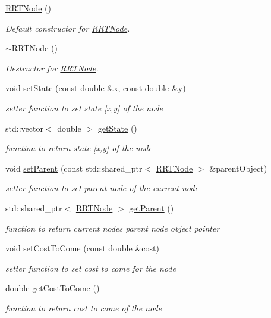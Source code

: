 \begin{DoxyCompactItemize}
\item 
\hyperlink{classRRTNode_a450dfa8045c8da49f359790501878106}{R\+R\+T\+Node} ()
\begin{DoxyCompactList}\small\item\em Default constructor for \hyperlink{classRRTNode}{R\+R\+T\+Node}. \end{DoxyCompactList}\item 
\hyperlink{classRRTNode_a6809e4173f614885337cb9e0f1ab3222}{$\sim$\+R\+R\+T\+Node} ()
\begin{DoxyCompactList}\small\item\em Destructor for \hyperlink{classRRTNode}{R\+R\+T\+Node}. \end{DoxyCompactList}\item 
void \hyperlink{classRRTNode_ab1a5aa8a8e7c33fca0cee09c208a2b51}{set\+State} (const double \&x, const double \&y)
\begin{DoxyCompactList}\small\item\em setter function to set state \mbox{[}x,y\mbox{]} of the node \end{DoxyCompactList}\item 
std\+::vector$<$ double $>$ \hyperlink{classRRTNode_a73f2b83a8babef45d6336cd512532257}{get\+State} ()
\begin{DoxyCompactList}\small\item\em function to return state \mbox{[}x,y\mbox{]} of the node \end{DoxyCompactList}\item 
void \hyperlink{classRRTNode_a168d651956a9d3ff5a97dfc14b2cbff9}{set\+Parent} (const std\+::shared\+\_\+ptr$<$ \hyperlink{classRRTNode}{R\+R\+T\+Node} $>$ \&parent\+Object)
\begin{DoxyCompactList}\small\item\em setter function to set parent node of the current node \end{DoxyCompactList}\item 
std\+::shared\+\_\+ptr$<$ \hyperlink{classRRTNode}{R\+R\+T\+Node} $>$ \hyperlink{classRRTNode_ad53ba7bac9b3119510b6a7b5dc3ac378}{get\+Parent} ()
\begin{DoxyCompactList}\small\item\em function to return current node\textquotesingle{}s parent node object pointer \end{DoxyCompactList}\item 
void \hyperlink{classRRTNode_af7986ea058b3a697bf1977903b286edd}{set\+Cost\+To\+Come} (const double \&cost)
\begin{DoxyCompactList}\small\item\em setter function to set cost to come for the node \end{DoxyCompactList}\item 
double \hyperlink{classRRTNode_aef17b4bd6901c1b1bfc381f862ebfaa1}{get\+Cost\+To\+Come} ()
\begin{DoxyCompactList}\small\item\em function to return cost to come of the node \end{DoxyCompactList}\end{DoxyCompactItemize}


